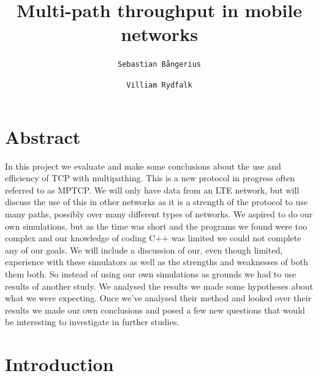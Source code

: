 \documentclass[11pt,twocolumn]{article}
\author{
  \texttt{Sebastian Bångerius}
  \and
  \texttt{Villiam Rydfalk}
}
\begin{document}

\title{Multi-path throughput in mobile networks}
\maketitle

\cleardoublepage


\section{Abstract}

In this project we evaluate and make some conclusions about the use and efficiency of TCP with multipathing. This is a new protocol in progress often referred to as MPTCP. We will only have data from an LTE network, but will discuss the use of this in other networks as it is a strength of the protocol to use many paths, possibly over many different types of networks. We aspired to do our own simulations, but as the time was short and the programs we found  were too complex and our knowledge of coding C++ was limited we could not complete any of our goals. We will include a discussion of our, even though limited, experience with these simulators as well as the strengths and weaknesses of both them both. So instead of using our own simulations as grounds we had to use results of another study. \cite{MPTCP-LTE} We analysed the results we made some hypotheses about what we were expecting. Once we've analysed their method and looked over their results we made our own conclusions and posed a few new questions that would be interesting to investigate in further studies.



\section{Introduction}
\end{document}
